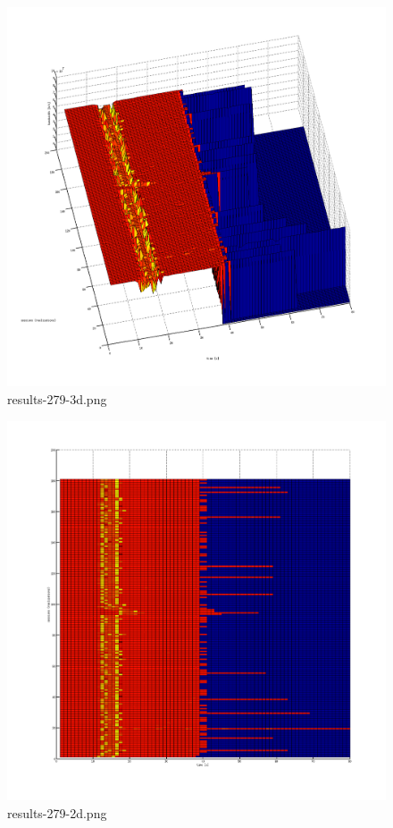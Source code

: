 \begin{figure}[htb]
	\begin{center}
	\includegraphics[width=\textwidth]{results-279-3d.png}
	\end{center}
	\caption{results-279-3d.png}
	\label{img:results-279-3d.png}
\end{figure}
\begin{figure}[htb]
	\begin{center}
	\includegraphics[width=\textwidth]{results-279-2d.png}
	\end{center}
	\caption{results-279-2d.png}
	\label{img:results-279-2d.png}
\end{figure}

